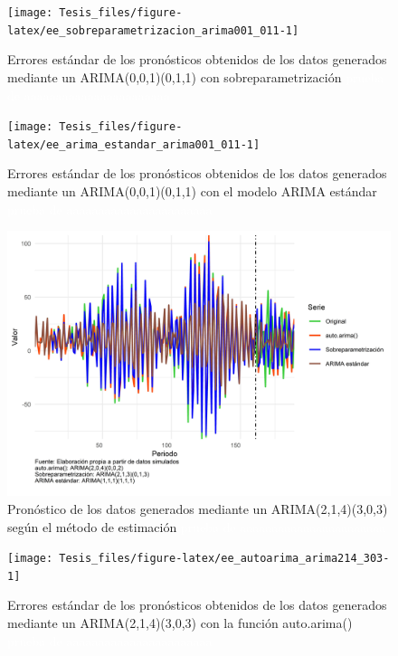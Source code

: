 \documentclass[
]{article}
\begin{document}
\begin{figure}[H]
\texttt{[image: Tesis\_files/figure-latex/ee\_sobreparametrizacion\_arima001\_011-1]} \caption{Errores estándar de los pronósticos obtenidos de los datos generados mediante un ARIMA(0,0,1)(0,1,1) con sobreparametrización \textcolor{white}{prueba de aaaaaaaaaaaaaaaaaaaaaaa}}\label{fig:ee_sobreparametrizacion_arima001_011}
\end{figure}

\begin{figure}[H]
\texttt{[image: Tesis\_files/figure-latex/ee\_arima\_estandar\_arima001\_011-1]} \caption{Errores estándar de los pronósticos obtenidos de los datos generados mediante un ARIMA(0,0,1)(0,1,1) con el modelo ARIMA estándar \textcolor{white}{prueba de aaaaaaaaaaaaaaaaaaaaaaa}}\label{fig:ee_arima_estandar_arima001_011}
\end{figure}

\begin{figure}[H]
\includegraphics[width=1\linewidth,height=1\textheight]{Tesis_files/figure-latex/pronostico_arima214_303-1} \caption{Pronóstico de los datos generados mediante un ARIMA(2,1,4)(3,0,3) según el método de estimación \textcolor{white}{prueba de aaaaaaaaaaaaaaaaaaaaaaa}}\label{fig:pronostico_arima214_303}
\end{figure}

\begin{figure}[H]
\texttt{[image: Tesis\_files/figure-latex/ee\_autoarima\_arima214\_303-1]} \caption{Errores estándar de los pronósticos obtenidos de los datos generados mediante un ARIMA(2,1,4)(3,0,3) con la función auto.arima() \textcolor{white}{prueba de aaaaaaaaaaaaaaaaaaaaaaa}}\label{fig:ee_autoarima_arima214_303}
\end{figure}
\end{document}
